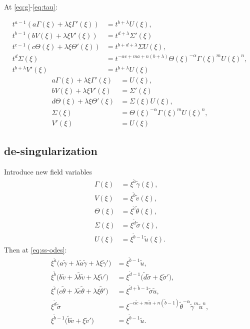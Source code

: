 \documentclass[a4paper,11pt]{article}
\def\tg{{\tilde{\gamma}}}
\def\tv{{\tilde{v}}}
\def\tth{{\tilde{\theta}}}
\def\ts{{\tilde{\sigma}}}
\def\tu{{\tilde{u}}}
\def\ta{{\tilde{a}}}
\def\tb{{\tilde{b}}}
\def\tc{{\tilde{c}}}
\def\td{{\tilde{d}}}
\begin{document}
At \eqref{eq:g}-\eqref{eq:tau}:

\begin{align*}
 t^{a-1}(a \Gamma(\xi) + \lambda \xi \Gamma'(\xi)) &= t^{b+ \lambda} U(\xi),\\
 t^{b-1}(b V(\xi) + \lambda \xi V'(\xi)) &= t^{d+ \lambda} \Sigma'(\xi)\\
 t^{c-1}(c \Theta(\xi) + \lambda \xi \Theta'(\xi))&=t^{b+d+\lambda} \Sigma U(\xi),\\
 t^d\Sigma(\xi) &= t^{-\alpha c +ma +n(b+ \lambda)} \Theta(\xi)^{-\alpha} \Gamma(\xi)^m U(\xi)^n,\\
 t^{b+\lambda}V'(\xi)&=t^{b+\lambda}U(\xi)
\end{align*}
\begin{equation}
\begin{aligned}
 a \Gamma(\xi) + \lambda \xi \Gamma'(\xi) &= U(\xi),\\
 b V(\xi) + \lambda \xi V'(\xi) &= \Sigma'(\xi)\\
 d \Theta(\xi) + \lambda \xi \Theta'(\xi)&=\Sigma(\xi) U(\xi),\\
 \Sigma(\xi) &= \Theta(\xi)^{-\alpha} \Gamma(\xi)^m U(\xi)^n,\\
 V'(\xi)&=U(\xi)
\end{aligned} \label{eq:ss-odes}
\end{equation}
\subsection{de-singularization}
Introduce new field variables 
\begin{equation}
\begin{aligned}
 \Gamma(\xi) &= \xi^\ta \tg(\xi),\\
 V(\xi)&=\xi^\tb \tv(\xi),\\
 \Theta(\xi)&=\xi^\tc \tth(\xi),\\
 \Sigma(\xi)&=\xi^\td \ts(\xi),\\
 U(\xi)&=\xi^{\tb-1} \tu(\xi). 
\end{aligned}
\end{equation}
Then at \eqref{eq:ss-odes}:
\begin{align*}
 \xi^\ta\Big( a\tg + \lambda \ta \tg + \lambda\xi\tg'\Big) &=\xi^{\tb-1} \tu,\\
 \xi^\tb\Big( b\tv + \lambda \tb \tv + \lambda\xi\tv'\Big) &=\xi^{\td-1} \Big(\td\ts + \xi\ts'\Big),\\
 \xi^\tc\Big( c\tth+ \lambda \tc \tth+ \lambda\xi\tth'\Big)&=\xi^{\td+\tb-1} \ts\tu,\\
 \xi^\td\ts &= \xi^{-\alpha \tc +m\ta +n(\tb-1)} \tth^{-\alpha} \tg^m \tu^n,\\
 \xi^{\tb-1}\Big(\tb\tv + \xi \tv'\Big)&= \xi^{\tb-1} \tu.
\end{align*}
\end{document}
